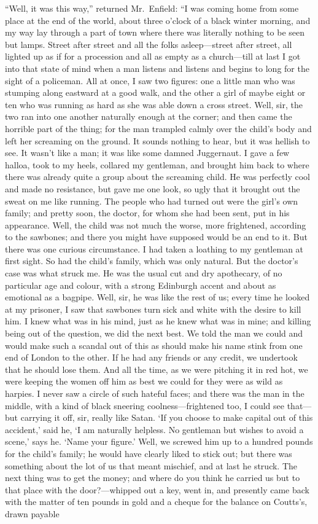 \documentclass[12pt,openright]{book}
\begin{document}
“Well, it was this way,” returned Mr. Enfield: “I was coming home from some place at the end of the world, about three o’clock of a black winter morning, and my way lay through a part of town where there was literally nothing to be seen but lamps. Street after street and all the folks asleep—street after street, all lighted up as if for a procession and all as empty as a church—till at last I got into that state of mind when a man listens and listens and begins to long for the sight of a policeman. All at once, I saw two figures: one a little man who was stumping along eastward at a good walk, and the other a girl of maybe eight or ten who was running as hard as she was able down a cross street. Well, sir, the two ran into one another naturally enough at the corner; and then came the horrible part of the thing; for the man trampled calmly over the child’s body and left her screaming on the ground. It sounds nothing to hear, but it was hellish to see. It wasn’t like a man; it was like some damned Juggernaut. I gave a few halloa, took to my heels, collared my gentleman, and brought him back to where there was already quite a group about the screaming child. He was perfectly cool and made no resistance, but gave me one look, so ugly that it brought out the sweat on me like running. The people who had turned out were the girl’s own family; and pretty soon, the doctor, for whom she had been sent, put in his appearance. Well, the child was not much the worse, more frightened, according to the sawbones; and there you might have supposed would be an end to it. But there was one curious circumstance. I had taken a loathing to my gentleman at first sight. So had the child’s family, which was only natural. But the doctor’s case was what struck me. He was the usual cut and dry apothecary, of no particular age and colour, with a strong Edinburgh accent and about as emotional as a bagpipe. Well, sir, he was like the rest of us; every time he looked at my prisoner, I saw that sawbones turn sick and white with the desire to kill him. I knew what was in his mind, just as he knew what was in mine; and killing being out of the question, we did the next best. We told the man we could and would make such a scandal out of this as should make his name stink from one end of London to the other. If he had any friends or any credit, we undertook that he should lose them. And all the time, as we were pitching it in red hot, we were keeping the women off him as best we could for they were as wild as harpies. I never saw a circle of such hateful faces; and there was the man in the middle, with a kind of black sneering coolness—frightened too, I could see that—but carrying it off, sir, really like Satan. ‘If you choose to make capital out of this accident,’ said he, ‘I am naturally helpless. No gentleman but wishes to avoid a scene,’ says he. ‘Name your figure.’ Well, we screwed him up to a hundred pounds for the child’s family; he would have clearly liked to stick out; but there was something about the lot of us that meant mischief, and at last he struck. The next thing was to get the money; and where do you think he carried us but to that place with the door?—whipped out a key, went in, and presently came back with the matter of ten pounds in gold and a cheque for the balance on Coutts’s, drawn payable 
\end{document}
